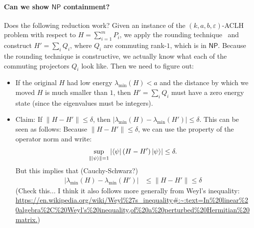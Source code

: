 \documentclass[11pt]{article}
\theoremstyle{plain}
\newcommand{\eps}{\varepsilon}
\begin{document}
\paragraph{Can we show $\mathsf{NP}$ containment?}
Does the following reduction work? Given an instance of the $(k,a,b,\eps)$-ACLH problem with respect to $H= \sum_{i=1}^m P_i$, we apply the rounding technique~\cite[Theorem 3.2]{https://doi.org/10.4230/lipics.itcs.2017.48} and construct $H'=\sum_i Q_i$, where $Q_i$ are commuting rank-$1$, which is in $\mathsf{NP}$. Because the rounding technique is constructive, we actually know what each of the commuting projectors $Q_i$ look like. Then we need to figure out:
\begin{itemize}
    \item If the original $H$ had low energy $\lambda_{\mathrm{min}}(H) < a$ and the distance by which we moved $H$ is much smaller than $1$, then $H'=\sum_i Q_i$ must have a zero energy state (since the eigenvalues must be integers).

    \item Claim: If $\|H - H'\| \leq \delta$, then $|\lambda_{\mathrm{min}}(H) -\lambda_{\mathrm{min}}(H')| \leq \delta$. This can be seen as follows: Because $\|H - H'\| \leq \delta$, we can use the property of the operator norm and write:
$$
\sup_{\| \ket{\psi}\|=1} \left|\bra{\psi} (H - H') \ket{\psi}\right| \leq \delta.
$$
But this implies that (Cauchy-Schwarz?)
\begin{align*}
|\lambda_{\mathrm{min}}(H) -\lambda_{\mathrm{min}}(H')| 
&\leq \|H - H'\| \leq \delta
\end{align*}
(Check this... I think it also follows more generally from Weyl's inequality: \url{https://en.wikipedia.org/wiki/Weyl%27s_inequality#:~:text=In%20linear%20algebra%2C%20Weyl's%20inequality,of%20a%20perturbed%20Hermitian%20matrix.})
\end{itemize}


\newpage



\newpage
\end{document}
